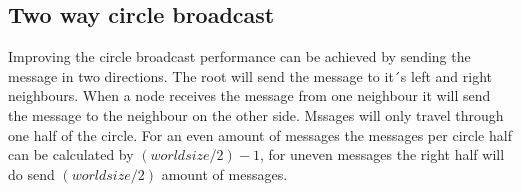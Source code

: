 \documentclass[10pt]{article}
\begin{document}
\subsection{Two way circle broadcast}
Improving the circle broadcast performance can be achieved by sending the message in two directions. The root will send the message to it´s left and right neighbours. When a node receives the message from one neighbour it will send the message to the neighbour on the other side. Mssages will only travel through one half of the circle. For an even amount of messages the messages per circle half can be calculated by $(world size / 2) - 1$, for uneven messages the right half will do send $(world size / 2)$ amount of messages.
\end{document}
